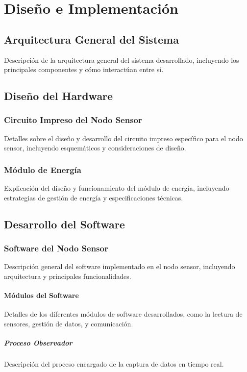 
\chapter{Diseño e Implementación}

\section{Arquitectura General del Sistema}
Descripción de la arquitectura general del sistema desarrollado, incluyendo los principales componentes y cómo interactúan entre sí.

\section{Diseño del Hardware}
\subsection{Circuito Impreso del Nodo Sensor}
Detalles sobre el diseño y desarrollo del circuito impreso específico para el nodo sensor, incluyendo esquemáticos y consideraciones de diseño.
\subsection{Módulo de Energía}
Explicación del diseño y funcionamiento del módulo de energía, incluyendo estrategias de gestión de energía y especificaciones técnicas.

\section{Desarrollo del Software}
\subsection{Software del Nodo Sensor}
Descripción general del software implementado en el nodo sensor, incluyendo arquitectura y principales funcionalidades.
\subsubsection{Módulos del Software}
Detalles de los diferentes módulos de software desarrollados, como la lectura de sensores, gestión de datos, y comunicación.
\paragraph{Proceso Observador}
Descripción del proceso encargado de la captura de datos en tiempo real.
